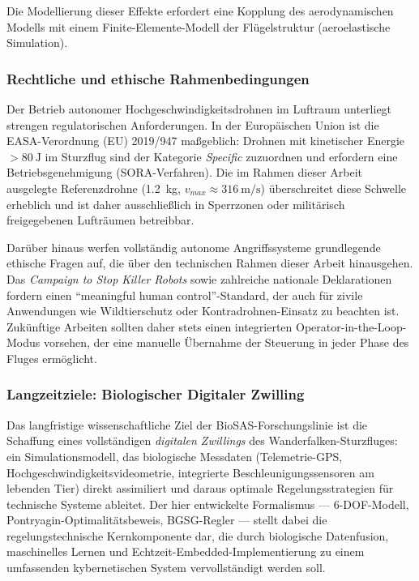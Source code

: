 ﻿\documentclass[12pt,a4paper]{article}
\theoremstyle{remark}
\begin{document}
	Die Modellierung dieser Effekte erfordert eine Kopplung des aerodynamischen Modells mit einem Finite-Elemente-Modell der Flügelstruktur (aeroelastische Simulation).

	\subsubsection{Rechtliche und ethische Rahmenbedingungen}

	Der Betrieb autonomer Hochgeschwindigkeitsdrohnen im Luftraum unterliegt strengen regulatorischen Anforderungen. In der Europäischen Union ist die EASA-Verordnung (EU) 2019/947 maßgeblich: Drohnen mit kinetischer Energie $> \SI{80}{\J}$ im Sturzflug sind der Kategorie \textit{Specific} zuzuordnen und erfordern eine Betriebsgenehmigung (SORA-Verfahren). Die im Rahmen dieser Arbeit ausgelegte Referenzdrohne (\SI{1.2}{\kg}, $v_{max} \approx \SI{316}{\m\per\second}$) überschreitet diese Schwelle erheblich und ist daher ausschließlich in Sperrzonen oder militärisch freigegebenen Lufträumen betreibbar.

	Darüber hinaus werfen vollständig autonome Angriffssysteme grundlegende ethische Fragen auf, die über den technischen Rahmen dieser Arbeit hinausgehen. Das \textit{Campaign to Stop Killer Robots} sowie zahlreiche nationale Deklarationen fordern einen ``meaningful human control''-Standard, der auch für zivile Anwendungen wie Wildtierschutz oder Kontradrohnen-Einsatz zu beachten ist. Zukünftige Arbeiten sollten daher stets einen integrierten Operator-in-the-Loop-Modus vorsehen, der eine manuelle Übernahme der Steuerung in jeder Phase des Fluges ermöglicht.

	\subsubsection{Langzeitziele: Biologischer Digitaler Zwilling}

	Das langfristige wissenschaftliche Ziel der BioSAS-Forschungslinie ist die Schaffung eines vollständigen \textit{digitalen Zwillings} des Wanderfalken-Sturzfluges: ein Simulationsmodell, das biologische Messdaten (Telemetrie-GPS, Hochgeschwindigkeitsvideometrie, integrierte Beschleunigungssensoren am lebenden Tier) direkt assimiliert und daraus optimale Regelungsstrategien für technische Systeme ableitet. Der hier entwickelte Formalismus --- 6-DOF-Modell, Pontryagin-Optimalitätsbeweis, BGSG-Regler --- stellt dabei die regelungstechnische Kernkomponente dar, die durch biologische Datenfusion, maschinelles Lernen und Echtzeit-Embedded-Implementierung zu einem umfassenden kybernetischen System vervollständigt werden soll.
	
\end{document}
